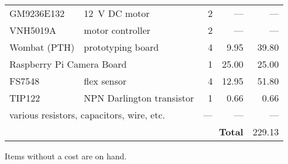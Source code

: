 {\begin{tabular}{llrrr}
    GM9236E132 & \SI{12}{\volt} DC motor                    & 2                 & ---                   & ---                   \\
    VNH5019A & motor controller                             & 2                 & ---                   & ---                   \\
    Wombat (PTH) & prototyping board                        & 4                 & 9.95                  & 39.80                 \\
    \multicolumn{2}{l}{Raspberry Pi Camera Board}           & 1                 & 25.00                 & 25.00                 \\
    FS7548 & flex sensor                                    & 4                 & 12.95                 & 51.80                 \\
    TIP122 & NPN Darlington transistor                      & 1                 & 0.66                  & 0.66                  \\
    \multicolumn{2}{l}{various resistors, capacitors, wire, etc.} & ---               & ---                   & ---                   \\ \hline
    \multicolumn{4}{r}{\textbf{Total}}                                                                  & 229.13                \\ \hline
\end{tabular}
Items without a cost are on hand.
}
